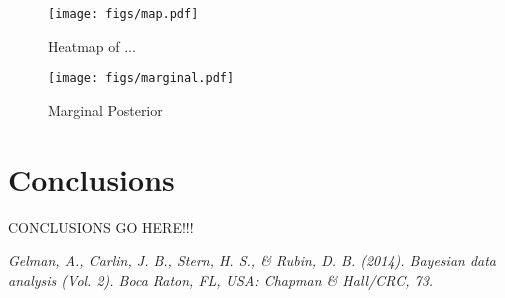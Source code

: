 \documentclass{../../tex_template/asaproc}
\begin{document}
\begin{figure}[H]
  \texttt{[image: figs/map.pdf]}
  \caption{\small Heatmap of ...}
  \label{fig:map}
\end{figure}

\begin{figure}[H]
  \texttt{[image: figs/marginal.pdf]}
  \caption{\small Marginal Posterior}
  \label{fig:marginal}
\end{figure}

\section{Conclusions}
CONCLUSIONS GO HERE!!!

\begin{references}
{\footnotesize
\itemsep=3pt
\item {\em Gelman, A., Carlin, J. B., Stern, H. S., \& Rubin, D. B. (2014). Bayesian data analysis (Vol. 2). Boca Raton, FL, USA: Chapman \& Hall/CRC, 73.}
}

\end{references}
\end{document}
